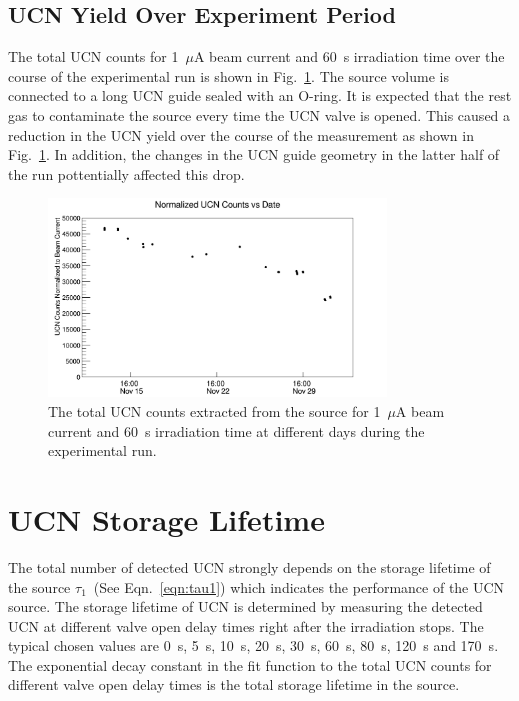 \subsection{UCN Yield Over Experiment Period}

The total UCN counts for 1~$\mu$A beam current and 60~s irradiation
time over the course of the experimental run is shown in
Fig.~\ref{fig:UCNCounts_time}. 
The source volume is connected to a long UCN guide sealed with an
O-ring. It is expected that the rest gas to contaminate the source
every time the UCN valve is opened. This caused a reduction in the UCN
yield over the course of the measurement as shown in
Fig.~\ref{fig:UCNCounts_time}. In addition, the changes in the UCN
guide geometry in the latter half of the run pottentially affected
this drop.


\begin{figure}[h]
  \centering
  \includegraphics[width=0.8\textwidth]{UCNCounts_vs_Time.png}
  \caption{The total UCN counts extracted from the source for 1~$\mu$A
    beam current and 60~s irradiation time at different days during
    the experimental run. }
  \label{fig:UCNCounts_time}
\end{figure}

\section{UCN Storage Lifetime~\label{storagelifetime}}

The total number of detected UCN strongly depends on the storage
lifetime of the source $\tau_1$~(See Eqn.~\ref{eqn:tau1}) which
indicates the performance of the UCN source. The storage lifetime of
UCN is determined by measuring the detected UCN at different valve
open delay times right after the irradiation stops. The typical chosen
values are 0~s, 5~s, 10~s, 20~s, 30~s, 60~s, 80~s, 120~s and
170~s. The exponential decay constant in the fit function to the total
UCN counts for different valve open delay times is the total storage
lifetime in the source.

